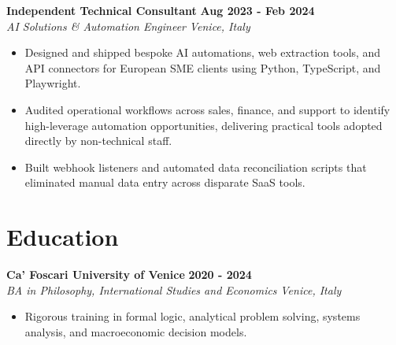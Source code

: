 \documentclass[10pt,a4paper]{article}
\newcommand{\role}[4]{%
  \textbf{#1} \hfill \textbf{#2}\\[1pt]%
  \textit{#3} \hfill \textit{#4}\\[2pt]%
}
\begin{document}
\role{Independent Technical Consultant}{Aug 2023 - Feb 2024}{AI Solutions \& Automation Engineer}{Venice, Italy}
\begin{itemize}
  \item Designed and shipped bespoke AI automations, web extraction tools, and API connectors for European SME clients using Python, TypeScript, and Playwright.
  \item Audited operational workflows across sales, finance, and support to identify high-leverage automation opportunities, delivering practical tools adopted directly by non-technical staff.
  \item Built webhook listeners and automated data reconciliation scripts that eliminated manual data entry across disparate SaaS tools.
\end{itemize}

\section{Education}
\role{Ca' Foscari University of Venice}{2020 - 2024}{BA in Philosophy, International Studies and Economics}{Venice, Italy}
\begin{itemize}
  \item Rigorous training in formal logic, analytical problem solving, systems analysis, and macroeconomic decision models.
\end{itemize}
\end{document}
